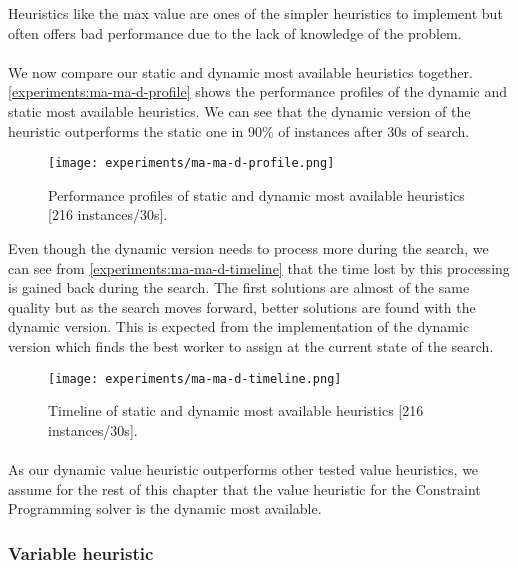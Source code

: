 \documentclass[../../thesis.tex]{subfiles}
\begin{document}
Heuristics like the max value are ones of the simpler heuristics to implement but often offers bad performance due to 
the lack of knowledge of the problem.

\paragraph{}

We now compare our static and dynamic most available heuristics together.
\autoref{experiments:ma-ma-d-profile} shows the performance profiles of the dynamic and static most available heuristics.
We can see that the dynamic version of the heuristic outperforms the static one in 90\% of instances after 30s of search.

\begin{figure}
  \centering
  \texttt{[image: experiments/ma-ma-d-profile.png]}
  \caption{Performance profiles of static and dynamic most available heuristics [216 instances/30s].}
  \label{experiments:ma-ma-d-profile}
\end{figure}

Even though the dynamic version needs to process more during the search, we can see from \autoref{experiments:ma-ma-d-timeline} that the time lost 
by this processing is gained back during the search. The first solutions are almost of the same quality but 
as the search moves forward, better solutions are found with the dynamic version. 
This is expected from the implementation of the dynamic version which finds the best worker to assign 
at the current state of the search.

\begin{figure}
  \centering
  \texttt{[image: experiments/ma-ma-d-timeline.png]}
  \caption{Timeline of static and dynamic most available heuristics [216 instances/30s].}
  \label{experiments:ma-ma-d-timeline}
\end{figure}


\paragraph{}

As our dynamic value heuristic outperforms other tested value heuristics, we assume for the rest of this chapter 
that the value heuristic for the Constraint Programming solver is the dynamic most available.



\subsubsection{Variable heuristic}
\end{document}
